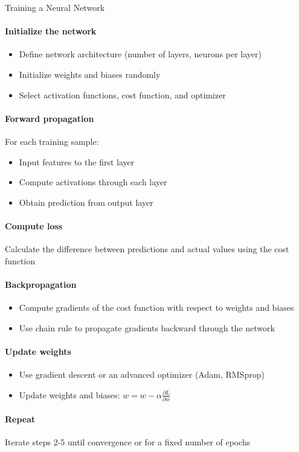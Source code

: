 \begin{KR}{Training a Neural Network}
\paragraph{Initialize the network}
\begin{itemize}
    \item Define network architecture (number of layers, neurons per layer)
    \item Initialize weights and biases randomly
    \item Select activation functions, cost function, and optimizer
\end{itemize}

\paragraph{Forward propagation}
For each training sample:
\begin{itemize}
    \item Input features to the first layer
    \item Compute activations through each layer
    \item Obtain prediction from output layer
\end{itemize}

\paragraph{Compute loss}
Calculate the difference between predictions and actual values using the cost function

\paragraph{Backpropagation}
\begin{itemize}
    \item Compute gradients of the cost function with respect to weights and biases
    \item Use chain rule to propagate gradients backward through the network
\end{itemize}

\paragraph{Update weights}
\begin{itemize}
    \item Use gradient descent or an advanced optimizer (Adam, RMSprop)
    \item Update weights and biases: $w = w - \alpha \frac{\partial L}{\partial w}$
\end{itemize}

\paragraph{Repeat}
Iterate steps 2-5 until convergence or for a fixed number of epochs
\end{KR}
\multend

